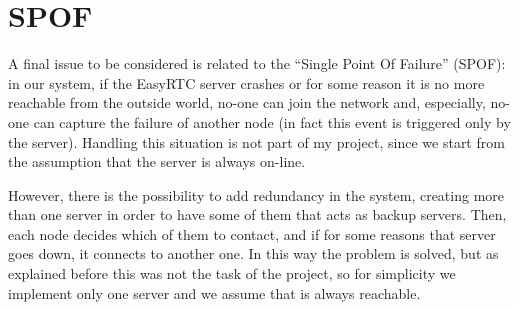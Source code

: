 \section{SPOF}
A final issue to be considered is related to the ``Single Point Of Failure'' (SPOF): in our system, if the EasyRTC server crashes or for some reason it is no more reachable from the outside world, no-one can join the network and, especially, no-one can capture the failure of another node (in fact this event is triggered only by the server). Handling this situation is not part of my project, since we start from the assumption that the server is always on-line.

However, there is the possibility to add redundancy in the system, creating more than one server in order to have some of them that acts as backup servers. Then, each node decides which of them to contact, and if for some reasons that server goes down, it connects to another one. In this way the problem is solved, but as explained before this was not the task of the project, so for simplicity we implement only one server and we assume that is always reachable.
